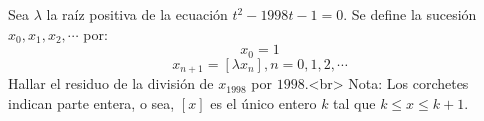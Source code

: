 Sea $\lambda$ la raíz positiva de la ecuación $t^2 - 1998t - 1 = 0$. Se define la sucesión $x_0, x_1, x_2, \cdots$ por:
\[ x_0 = 1 \]
\[ x_{n+1} = [\lambda x_n], n=0,1,2,\cdots \]
Hallar el residuo de la división de $x_{1998}$ por $1998$.<br>
Nota: Los corchetes indican parte entera, o sea, $[x]$ es el único entero $k$ tal que $k \leq x \leq k+1$.
